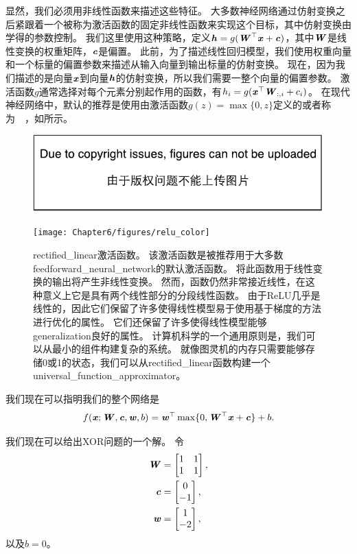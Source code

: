 显然，我们必须用非线性函数来描述这些特征。
大多数神经网络通过仿射变换之后紧跟着一个被称为激活函数的固定非线性函数来实现这个目标，其中仿射变换由学得的参数控制。
我们这里使用这种策略，定义$\boldsymbol{\mathit{h}}=g(\boldsymbol{\mathit{W}}^\top \boldsymbol{\mathit{x}}+\boldsymbol{\mathit{c}})$，其中$\boldsymbol{\mathit{W}}$是线性变换的权重矩阵，$\boldsymbol{\mathit{c}}$是偏置。
此前，为了描述线性回归模型，我们使用权重向量和一个标量的偏置参数来描述从输入向量到输出标量的仿射变换。
现在，因为我们描述的是向量$\boldsymbol{\mathit{x}}$到向量$\boldsymbol{\mathit{h}}$的仿射变换，所以我们需要一整个向量的偏置参数。
激活函数$g$通常选择对每个元素分别起作用的函数，有$h_i =g(\boldsymbol{\mathit{x}}^\top \boldsymbol{\mathit{W}}_{:, i} + c_i)$。
在现代神经网络中，默认的推荐是使用由激活函数$g(z)=\max\{0, z\}$定义的或者称为~~\citep{Jarrett-ICCV2009-small,Nair-2010-small,Glorot+al-AI-2011-small}，如所示。
\begin{figure}[!htb]
\ifOpenSource
\centerline{\includegraphics{figure.pdf}}
\else
\centerline{\texttt{[image: Chapter6/figures/relu\_color]}}
\fi
\caption{\gls{rectified_linear}激活函数。
该激活函数是被推荐用于大多数\gls{feedforward_neural_network}的默认激活函数。
将此函数用于线性变换的输出将产生非线性变换。 然而，函数仍然非常接近线性，在这种意义上它是具有两个线性部分的分段线性函数。
由于\gls{ReLU}几乎是线性的，因此它们保留了许多使得线性模型易于使用基于梯度的方法进行优化的属性。 它们还保留了许多使得线性模型能够\gls{generalization}良好的属性。 计算机科学的一个通用原则是，我们可以从最小的组件构建复杂的系统。
就像图灵机的内存只需要能够存储0或1的状态，我们可以从\gls{rectified_linear}函数构建一个\gls{universal_function_approximator}。}
\label{fig:chap6_relu_color}
\end{figure}


我们现在可以指明我们的整个网络是
\begin{equation}
f(\boldsymbol{\mathit{x}}; \boldsymbol{\mathit{W}}, \boldsymbol{\mathit{c}}, \boldsymbol{\mathit{w}}, b) = \boldsymbol{\mathit{w}}^\top \max\{ 0, \boldsymbol{\mathit{W}}^\top \boldsymbol{\mathit{x}} + \boldsymbol{\mathit{c}} \} +b.
\end{equation}



我们现在可以给出XOR问题的一个解。
令
\begin{align}
\boldsymbol{\mathit{W}} &= \begin{bmatrix}
1 & 1\\
1 & 1
\end{bmatrix},\\
\boldsymbol{\mathit{c}} &= \begin{bmatrix}
0\\
-1
\end{bmatrix},\\
\boldsymbol{\mathit{w}} &= \begin{bmatrix}
1\\
-2
\end{bmatrix},
\end{align}
以及$b=0$。

